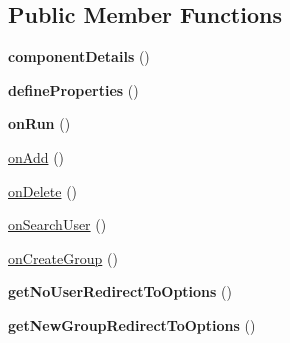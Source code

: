 \subsection*{Public Member Functions}
\begin{DoxyCompactItemize}
\item 
\hypertarget{classDMA_1_1Friends_1_1Components_1_1GroupFormCreation_aff169c7950266d239c20fb1c42cbd95a}{{\bfseries component\+Details} ()}\label{classDMA_1_1Friends_1_1Components_1_1GroupFormCreation_aff169c7950266d239c20fb1c42cbd95a}

\item 
\hypertarget{classDMA_1_1Friends_1_1Components_1_1GroupFormCreation_a9cac8a6091971e1e88d5ca104986cc31}{{\bfseries define\+Properties} ()}\label{classDMA_1_1Friends_1_1Components_1_1GroupFormCreation_a9cac8a6091971e1e88d5ca104986cc31}

\item 
\hypertarget{classDMA_1_1Friends_1_1Components_1_1GroupFormCreation_a0bee9cf0dc3a8923818d402fa3532477}{{\bfseries on\+Run} ()}\label{classDMA_1_1Friends_1_1Components_1_1GroupFormCreation_a0bee9cf0dc3a8923818d402fa3532477}

\item 
\hyperlink{classDMA_1_1Friends_1_1Components_1_1GroupFormCreation_a9dd18b90b440803a9026ac790275f804}{on\+Add} ()
\item 
\hyperlink{classDMA_1_1Friends_1_1Components_1_1GroupFormCreation_a7f4ddea881f2d0205ec7837c698e9490}{on\+Delete} ()
\item 
\hyperlink{classDMA_1_1Friends_1_1Components_1_1GroupFormCreation_a8cc5c8e020c44811c6ccdd75c7375940}{on\+Search\+User} ()
\item 
\hyperlink{classDMA_1_1Friends_1_1Components_1_1GroupFormCreation_aeddc641a6672000bcf9bcf89d338ee71}{on\+Create\+Group} ()
\item 
\hypertarget{classDMA_1_1Friends_1_1Components_1_1GroupFormCreation_a9c69342fdb9b56087dfd6ab7165e5f74}{{\bfseries get\+No\+User\+Redirect\+To\+Options} ()}\label{classDMA_1_1Friends_1_1Components_1_1GroupFormCreation_a9c69342fdb9b56087dfd6ab7165e5f74}

\item 
\hypertarget{classDMA_1_1Friends_1_1Components_1_1GroupFormCreation_adbe1bf34839afdab928e28f3043dc3b3}{{\bfseries get\+New\+Group\+Redirect\+To\+Options} ()}\label{classDMA_1_1Friends_1_1Components_1_1GroupFormCreation_adbe1bf34839afdab928e28f3043dc3b3}

\end{DoxyCompactItemize}
